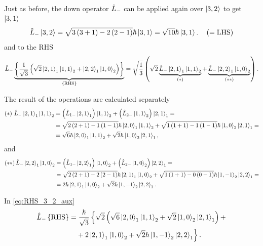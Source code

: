 Just as before, the down operator $\hat{L}_{-}$ can be applied again over $\Ket{3,2}$ to get $\Ket{3,1}$
\begin{equation}\label{eq:LHS_3_2}
    \hat{L}_{-} \Ket{3,2} = \sqrt{3\left( 3 + 1 \right) - 2\left( 2 - 1 \right)} \hbar \Ket{3,1} = \sqrt{10} \hbar \Ket{3,1}. 
    \quad \left( = \text{LHS} \right)
\end{equation}
and to the RHS
\begin{equation}\label{eq:RHS_3_2_aux}
    \hat{L}_{-} 
    \underbrace{ \left\{ \frac{1}{\sqrt{3}} \left( \sqrt{2} \Ket{2,1}_1 \Ket{1,1}_2 + \Ket{2,2}_1 \Ket{1,0}_2 \right) \right\} }_{\left\{\text{RHS}\right\}} =
    \sqrt{\frac{1}{3}} \left( \sqrt{2} \underbrace{\hat{L}_{-} \Ket{2,1}_1 \Ket{1,1}_2}_{(*)} + \underbrace{\hat{L}_{-} \Ket{2,2}_1 \Ket{1,0}_2}_{(**)} \right) .
\end{equation}

The result of the operations are calculated separately
\begin{align}
    \notag (*)  \ \hat{L}_{-} \Ket{2,1}_1 \Ket{1,1}_2 &= \left( \hat{L}_{1-} \Ket{2,1}_1 \right) \Ket{1,1}_2 + \left( \hat{L}_{2-} \Ket{1,1}_2 \right) \Ket{2,1}_1 =  \\
    \notag                              &= \sqrt{2\left( 2 + 1 \right) - 1\left( 1 - 1 \right)} \hbar \Ket{2,0}_1 \Ket{1,1}_2 + \sqrt{1\left( 1 + 1 \right) - 1\left( 1 - 1 \right)} \hbar \Ket{1,0}_2 \Ket{2,1}_1 = \\
                                        &= \sqrt{6} \hbar \Ket{2,0}_1 \Ket{1,1}_2 + \sqrt{2} \hbar \Ket{1,0}_2 \Ket{2,1}_1,
\end{align}
and
\begin{align}
    \notag (**) \, \hat{L}_{-} \Ket{2,2}_1 \Ket{1,0}_2 &= \left( \hat{L}_{1-} \Ket{2,2}_1 \right) \Ket{1,0}_2 + \left( \hat{L}_{2-} \Ket{1,0}_2 \right) \Ket{2,2}_1 =  \\
    \notag                              &= \sqrt{2\left( 2 + 1 \right) - 2\left( 2 - 1 \right)} \hbar \Ket{2,1}_1 \Ket{1,0}_2 + \sqrt{1\left( 1 + 1 \right) - 0\left( 0 - 1 \right)} \hbar \Ket{1,-1}_2 \Ket{2,2}_1 = \\
                                        &= 2 \hbar \Ket{2,1}_1 \Ket{1,0}_2 + \sqrt{2} \hbar \Ket{1,-1}_2 \Ket{2,2}_1.
\end{align}

In \cref{eq:RHS_3_2_aux} 
\begin{equation}
    \begin{split}
        \hat{L}_{-} \left\{ \text{RHS} \right\} &=
        \frac{ \hbar }{\sqrt{3}} \left\{ \sqrt{2} \left( \sqrt{6} \Ket{2,0}_1 \Ket{1,1}_2 + \sqrt{2} \Ket{1,0}_2 \Ket{2,1}_1 \right) + \right.\\
                                        & \left. \phantom{=} + 2 \Ket{2,1}_1 \Ket{1,0}_2 + \sqrt{2} \hbar \Ket{1,-1}_2 \Ket{2,2}_1 \right\}.
    \end{split}
\end{equation}

